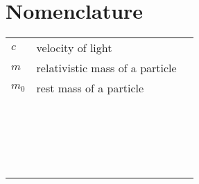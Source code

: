 \section{Nomenclature}\label{Nomenclature}


\begin{tabular}{lll}
$c$                    & velocity of light                                          &           \\
$m$                       &     relativistic mass of a  particle                    &            \\
$m_0$                       &     rest mass of a  particle                          &            \\
                  &                     &                 \\
                  &                     &                 \\
                  &                     &                 \\
                  &                     &                 \\
                  &                     &                 \\
                  &                     &                 \\
                  &                     &                 \\
                  &                     &                 \\
                  &                     &                 \\
                  &                     &                 \\
                  &                     &                 \\
                  &                     &                 \\
                  &                     &                 \\
                  &                     &                 \\
                  &                     &                 \\
                  &                     &                 \\
                  &                     &                 \\
                  &                     &                 \\
                  &                     &                 \\

\end{tabular}
